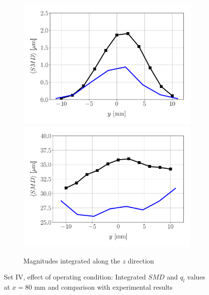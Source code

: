 \begin{figure}[ht]
\begin{subfigure}[b]{0.9\textwidth}
	\flushleft
   \includegraphics[scale=0.3]{./part2_developments/figures_ch6_lagrangian_JICF/expe_validation_set_4/integrated_fluxes_along_y}
   \hfill
   \includegraphics[scale=0.3]{./part2_developments/figures_ch6_lagrangian_JICF/expe_validation_set_4/integrated_SMD_along_y}
	\caption{Magnitudes integrated along the $z$ direction}
\end{subfigure}

   \caption{Set IV, effect of operating condition: Integrated $SMD$ and $q_l$ values at $x = 80$ mm and comparison with experimental results}
\end{figure}



